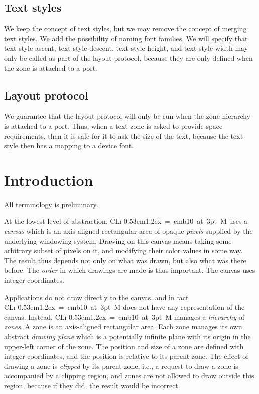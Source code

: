 \documentclass{report}
\def\Tiny{ \font\Tinyfont = cmb10 at 3pt \relax  \Tinyfont}
\def\clim{\textsf{CL{\i}\kern-0.53em\raise1.2ex\hbox{\Tiny 3}M}}
\begin{document}
\section{Text styles}

We keep the concept of text styles, but we may remove the concept of
merging text styles.  We add the possibility of naming font families. 
We will specify that text-style-ascent, text-style-descent,
text-style-height, and text-style-width may only be called as part of
the layout protocol, because they are only defined when the zone is
attached to a port. 

\section{Layout protocol}

We guarantee that the layout protocol will only be run when the zone
hierarchy is attached to a port.  Thus, when a text zone is asked to
provide space requirements, then it is safe for it to ask the size of
the text, because the text style then has a mapping to a device font. 

\chapter{Introduction}

All terminology is preliminary.

At the lowest level of abstraction, \clim{} uses a \emph{canvas} which
is an axis-aligned rectangular area of opaque \emph{pixels} supplied by
the underlying windowing system.  Drawing on this canvas means taking
some arbitrary subset of pixels on it, and modifying their color
values in some way.  The result thus depends not only on what was
drawn, but also what was there before.  The \emph{order} in which
drawings are made is thus important.  The canvas uses integer
coordinates.

Applications do not draw directly to the canvas, and in fact \clim{}
does not have any representation of the canvas.  Instead,
\clim{} manages a \emph{hierarchy} of \emph{zones}.  A zone is an
axis-aligned rectangular area.  Each zone manages its own abstract
\emph{drawing plane} which is a potentially infinite plane with its
origin in the upper-left corner of the zone.  The position and size
of a zone are defined with integer coordinates, and the position is
relative to its parent zone.  The effect of drawing a zone is
\emph{clipped} by its parent zone, i.e., a request to draw a zone
is accompanied by a clipping region, and zones are not allowed to
draw outside this region, because if they did, the result would be
incorrect. 
\end{document}
